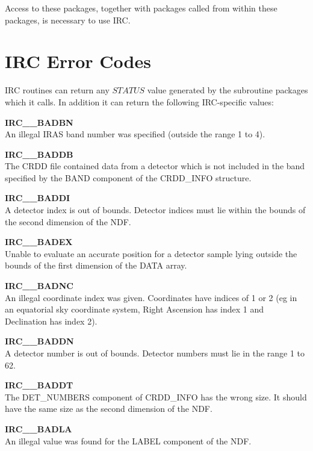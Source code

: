 Access to these packages, together with packages called from within these 
packages, is necessary to use IRC. 

\section {IRC Error Codes}
\label {APP:ERRORS}
IRC routines can return any $STATUS$ value generated by the subroutine packages 
which it calls. In addition it can return the following IRC-specific values:

\begin{description}

\item {\bf IRC\_\_BADBN     }\\
An illegal IRAS band number was specified (outside the range 1 to 4). 

\item {\bf IRC\_\_BADDB     }\\
The CRDD file contained data from a detector which is not included in the band 
specified by the BAND component of the CRDD\_INFO structure.

\item {\bf IRC\_\_BADDI     }\\
A detector index is out of bounds. Detector indices must lie within the bounds 
of the second dimension of the NDF.

\item {\bf IRC\_\_BADEX     }\\
Unable to evaluate an accurate position for a detector sample lying outside the 
bounds of the first dimension of the DATA array.

\item {\bf IRC\_\_BADNC     }\\
An illegal coordinate index was given. Coordinates have indices of 1 or 2 (eg
in an equatorial sky coordinate system, Right Ascension has index 1 and 
Declination has index 2).

\item {\bf IRC\_\_BADDN     }\\
A detector number is out of bounds. Detector numbers must lie in the range 
1 to 62.

\item {\bf IRC\_\_BADDT     }\\
The DET\_NUMBERS component of CRDD\_INFO has the wrong size. It should have the 
same size as the second dimension of the NDF.

\item {\bf IRC\_\_BADLA     }\\
An illegal value was found for the LABEL component of the NDF.


\end{description}
